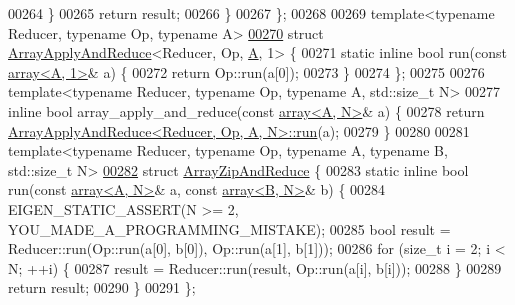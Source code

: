 \begin{DoxyCode}
00264     \}
00265     \textcolor{keywordflow}{return} result;
00266   \}
00267 \};
00268 
00269 \textcolor{keyword}{template}<\textcolor{keyword}{typename} Reducer, \textcolor{keyword}{typename} Op, \textcolor{keyword}{typename} A>
\hyperlink{struct_eigen_1_1internal_1_1_array_apply_and_reduce_3_01_reducer_00_01_op_00_01_a_00_011_01_4}{00270} \textcolor{keyword}{struct }\hyperlink{struct_eigen_1_1internal_1_1_array_apply_and_reduce}{ArrayApplyAndReduce}<Reducer, Op, \hyperlink{group___core___module_class_eigen_1_1_matrix}{A}, 1>  \{
00271   \textcolor{keyword}{static} \textcolor{keyword}{inline} \textcolor{keywordtype}{bool} run(\textcolor{keyword}{const} \hyperlink{class_eigen_1_1array}{array<A, 1>}& a) \{
00272     \textcolor{keywordflow}{return} Op::run(a[0]);
00273   \}
00274 \};
00275 
00276 \textcolor{keyword}{template}<\textcolor{keyword}{typename} Reducer, \textcolor{keyword}{typename} Op, \textcolor{keyword}{typename} A, std::\textcolor{keywordtype}{size\_t} N>
00277 \textcolor{keyword}{inline} \textcolor{keywordtype}{bool} array\_apply\_and\_reduce(\textcolor{keyword}{const} \hyperlink{class_eigen_1_1array}{array<A, N>}& a) \{
00278   \textcolor{keywordflow}{return} \hyperlink{struct_eigen_1_1internal_1_1_array_apply_and_reduce}{ArrayApplyAndReduce<Reducer, Op, A, N>::run}(a);
00279 \}
00280 
00281 \textcolor{keyword}{template}<\textcolor{keyword}{typename} Reducer, \textcolor{keyword}{typename} Op, \textcolor{keyword}{typename} A, \textcolor{keyword}{typename} B, std::\textcolor{keywordtype}{size\_t} N>
\hyperlink{struct_eigen_1_1internal_1_1_array_zip_and_reduce}{00282} \textcolor{keyword}{struct }\hyperlink{struct_eigen_1_1internal_1_1_array_zip_and_reduce}{ArrayZipAndReduce} \{
00283   \textcolor{keyword}{static} \textcolor{keyword}{inline} \textcolor{keywordtype}{bool} run(\textcolor{keyword}{const} \hyperlink{class_eigen_1_1array}{array<A, N>}& a, \textcolor{keyword}{const} \hyperlink{class_eigen_1_1array}{array<B, N>}& b) \{
00284     EIGEN\_STATIC\_ASSERT(N >= 2, YOU\_MADE\_A\_PROGRAMMING\_MISTAKE);
00285     \textcolor{keywordtype}{bool} result = Reducer::run(Op::run(a[0], b[0]), Op::run(a[1], b[1]));
00286     \textcolor{keywordflow}{for} (\textcolor{keywordtype}{size\_t} i = 2; i < N; ++i) \{
00287       result = Reducer::run(result, Op::run(a[i], b[i]));
00288     \}
00289     \textcolor{keywordflow}{return} result;
00290   \}
00291 \};

\end{DoxyCode}
